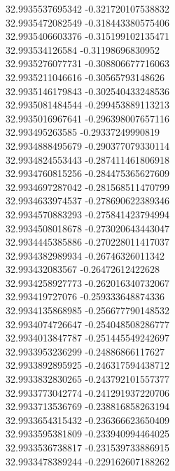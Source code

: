 {32.9935537695342	-0.321720107538832\\
32.9935472082549	-0.318443380575406\\
32.9935406603376	-0.315199102135471\\
32.993534126584	-0.31198696830952\\
32.9935276077731	-0.308806677716063\\
32.9935211046616	-0.30565793148626\\
32.9935146179843	-0.302540433248536\\
32.9935081484544	-0.299453889113213\\
32.9935016967641	-0.296398007657116\\
32.993495263585	-0.29337249990819\\
32.9934888495679	-0.290377079330114\\
32.9934824553443	-0.287411461806918\\
32.9934760815256	-0.284475365627609\\
32.9934697287042	-0.281568511470799\\
32.9934633974537	-0.278690622389346\\
32.9934570883293	-0.275841423794994\\
32.9934508018678	-0.273020643443047\\
32.9934445385886	-0.270228011417037\\
32.9934382989934	-0.26746326011342\\
32.993432083567	-0.26472612422628\\
32.9934258927773	-0.262016340732067\\
32.993419727076	-0.259333648874336\\
32.9934135868985	-0.256677790148532\\
32.9934074726647	-0.254048508286777\\
32.9934013847787	-0.251445549242697\\
32.9933953236299	-0.24886866117627\\
32.9933892895925	-0.246317594438712\\
32.9933832830265	-0.243792101557377\\
32.9933773042774	-0.241291937220706\\
32.9933713536769	-0.238816858263194\\
32.9933654315432	-0.236366623650409\\
32.9933595381809	-0.233940994464025\\
32.9933536738817	-0.231539733886915\\
32.9933478389244	-0.229162607188262\\
}
